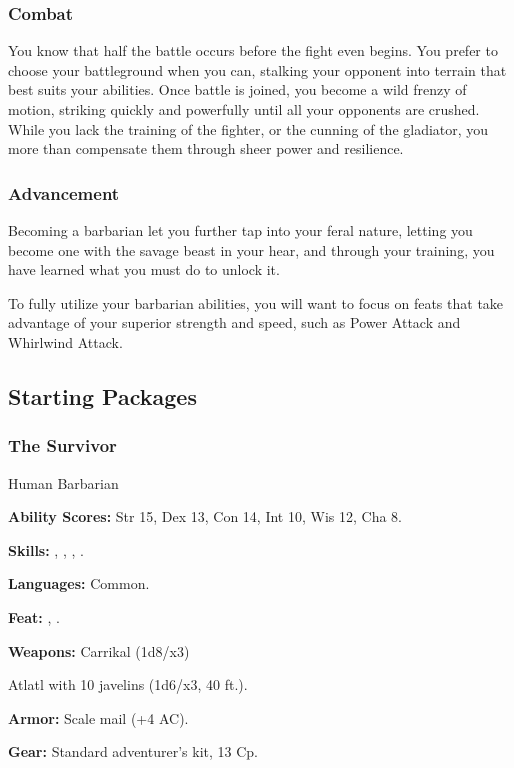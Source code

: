 \subsubsection{Combat}

You know that half the battle occurs before the fight even begins. You prefer to choose your battleground when you can, stalking your opponent into terrain that best suits your abilities. Once battle is joined, you become a wild frenzy of motion, striking quickly and powerfully until all your opponents are crushed. While you lack the training of the fighter, or the cunning of the gladiator, you more than compensate them through sheer power and resilience.

\subsubsection{Advancement}

Becoming a barbarian let you further tap into your feral nature, letting you become one with the savage beast in your hear, and through your training, you have learned what you must do to unlock it.

To fully utilize your barbarian abilities, you will want to focus on feats that take advantage of your superior strength and speed, such as Power Attack and Whirlwind Attack.

\subsection{Starting Packages}

\subsubsection{The Survivor}

Human Barbarian

\textbf{Ability Scores:} Str 15, Dex 13, Con 14, Int 10, Wis 12, Cha 8.

\textbf{Skills:} , , , .

\textbf{Languages:} Common.

\textbf{Feat:} , .

\textbf{Weapons:} Carrikal (1d8/x3)

Atlatl with 10 javelins (1d6/x3, 40 ft.).

\textbf{Armor:} Scale mail (+4 AC).

\textbf{Gear:} Standard adventurer's kit, 13 Cp.

